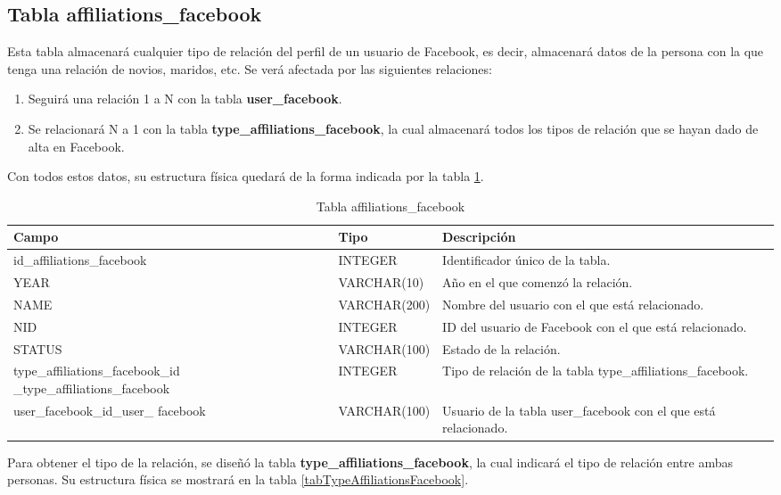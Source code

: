 \subsection{Tabla affiliations\_facebook}
Esta tabla almacenará cualquier tipo de relación del perfil de un usuario de Facebook, es decir, almacenará datos de la persona con la que tenga una relación de novios, maridos, etc. Se verá afectada por las siguientes relaciones:
\begin{enumerate}
\item Seguirá una relación 1 a N con la tabla \textbf{user\_facebook}.
\item Se relacionará N a 1 con la tabla \textbf{type\_affiliations\_facebook}, la cual almacenará todos los tipos de relación que se hayan dado de alta en Facebook.
\end{enumerate}
\bigskip
\par
Con todos estos datos, su estructura física quedará de la forma indicada por la tabla \ref{tabAffiliationsFacebook}.
\bigskip
\par
\begin{table}[h]
\begin{center}
\begin{tabular}{| p{55mm}  | l | p{60mm} |}\hline
\textbf{Campo}&\textbf{Tipo}&\textbf{Descripción} \\ \hline
id\_affiliations\_facebook & INTEGER & Identificador único de la tabla. \\ \hline
YEAR & VARCHAR(10) & Año en el que comenzó la relación. \\ \hline
NAME & VARCHAR(200) & Nombre del usuario con el que está relacionado. \\ \hline
NID & INTEGER & ID del usuario de Facebook con el que está relacionado. \\ \hline
STATUS & VARCHAR(100) & Estado de la relación. \\ \hline
type\_affiliations\_facebook\_id \_type\_affiliations\_facebook & INTEGER & Tipo de relación de la tabla type\_affiliations\_facebook. \\ \hline
user\_facebook\_id\_user\_ facebook & VARCHAR(100) & Usuario de la tabla user\_facebook con el que está relacionado. \\ \hline
\end{tabular}
\end{center}
\caption{Tabla affiliations\_facebook} \label{tabAffiliationsFacebook}
\end{table}
\bigskip
\par
Para obtener el tipo de la relación, se diseñó la tabla \textbf{type\_affiliations\_facebook}, la cual indicará el tipo de relación entre ambas personas. Su estructura física se mostrará en la tabla \ref{tabTypeAffiliationsFacebook}.

